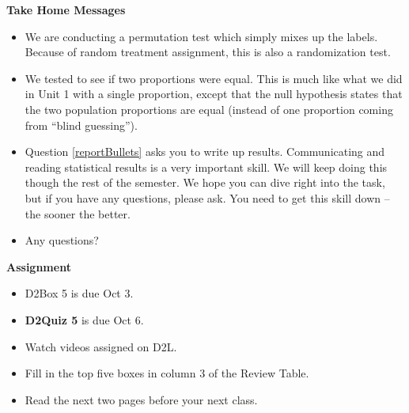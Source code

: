 \begin{center}
  {\bf Take Home Messages}
\end{center}
  \begin{itemize}
  \item We are conducting a permutation test which simply mixes up the
    labels.  Because of random treatment assignment, this is also a
    randomization test. 
  \item We tested to see if  two proportions were
    equal. This is much like what we did in Unit 1 with a single
    proportion, except that the null hypothesis states that the two
    population proportions are equal (instead of one proportion coming
    from ``blind guessing'').
  \item Question \ref{reportBullets} asks you to write up results.
    Communicating 
    and reading statistical results is a very important skill.  We
    will keep doing this though the rest of the semester.  We hope you
    can dive right into the task, but if you have any questions,
    please ask.  You need to get this skill down -- the sooner the
    better. 
 \item 
 Any questions?\vfill
  \end{itemize}





\noindent
{\bf Assignment} \vspace{-.2in}
\begin{itemize}
 \item D2Box 5 is due Oct 3.
 \item {\bf D2Quiz 5} is due Oct 6.
  \item Watch videos assigned on D2L.
  \item Fill in the top five boxes in column 3 of the Review Table.
  \item Read the next two pages before your next class.
\end{itemize}


